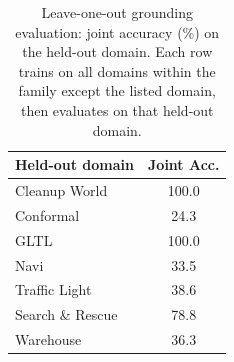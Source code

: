 \begin{table}[t]
\centering
\caption{Leave-one-out grounding evaluation: joint accuracy (\%) on the held-out domain.
  Each row trains on all domains within the family except the listed domain,
  then evaluates on that held-out domain.}
\label{tab:ablation-loo}
\small
\begin{tabular}{lc}
\toprule
Held-out domain & Joint Acc. \\
\midrule
Cleanup World & 100.0 \\
Conformal & 24.3 \\
GLTL & 100.0 \\
Navi & 33.5 \\
\midrule
Traffic Light & 38.6 \\
Search \& Rescue & 78.8 \\
Warehouse & 36.3 \\
\bottomrule
\end{tabular}
\end{table}
